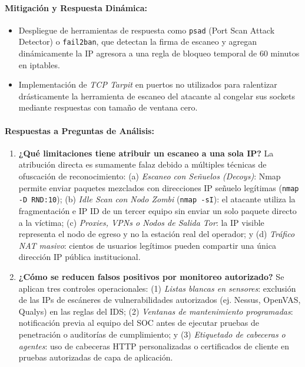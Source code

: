 \documentclass[11pt,letterpaper]{article}
\begin{document}
\paragraph{Mitigación y Respuesta Dinámica:}
\begin{itemize}
    \item Despliegue de herramientas de respuesta como \texttt{psad} (Port Scan Attack Detector) o \texttt{fail2ban}, que detectan la firma de escaneo y agregan dinámicamente la IP agresora a una regla de bloqueo temporal de 60 minutos en iptables.
    \item Implementación de \textit{TCP Tarpit} en puertos no utilizados para ralentizar drásticamente la herramienta de escaneo del atacante al congelar sus sockets mediante respuestas con tamaño de ventana cero.
\end{itemize}

\paragraph{Respuestas a Preguntas de Análisis:}
\begin{enumerate}
    \item \textbf{¿Qué limitaciones tiene atribuir un escaneo a una sola IP?} La atribución directa es sumamente falaz debido a múltiples técnicas de ofuscación de reconocimiento: (a) \textit{Escaneo con Señuelos (Decoys)}: Nmap permite enviar paquetes mezclados con direcciones IP señuelo legítimas (\texttt{nmap -D RND:10}); (b) \textit{Idle Scan con Nodo Zombi} (\texttt{nmap -sI}): el atacante utiliza la fragmentación e IP ID de un tercer equipo sin enviar un solo paquete directo a la víctima; (c) \textit{Proxies, VPNs o Nodos de Salida Tor}: la IP visible representa el nodo de egreso y no la estación real del operador; y (d) \textit{Tráfico NAT masivo}: cientos de usuarios legítimos pueden compartir una única dirección IP pública institucional.
    \item \textbf{¿Cómo se reducen falsos positivos por monitoreo autorizado?} Se aplican tres controles operacionales: (1) \textit{Listas blancas en sensores}: exclusión de las IPs de escáneres de vulnerabilidades autorizados (ej. Nessus, OpenVAS, Qualys) en las reglas del IDS; (2) \textit{Ventanas de mantenimiento programadas}: notificación previa al equipo del SOC antes de ejecutar pruebas de penetración o auditorías de cumplimiento; y (3) \textit{Etiquetado de cabeceras o agentes}: uso de cabeceras HTTP personalizadas o certificados de cliente en pruebas autorizadas de capa de aplicación.
\end{enumerate}
\end{document}
